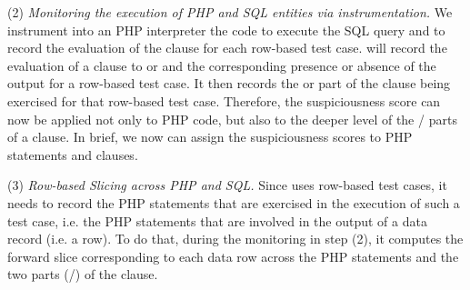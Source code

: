 
(2) {\em Monitoring the execution of PHP and SQL entities via
  instrumentation.} We instrument into an PHP interpreter the code to
execute the SQL query and to record the evaluation of the 
clause for each row-based test case. {\tool} will record the
evaluation of a  clause to  or  and
the corresponding presence or absence of the output for a row-based
test case. It then records the  or  part of the
 clause being exercised for that row-based test case.
Therefore, the suspiciousness score can now be applied not only to PHP
code, but also to the deeper level of the /
parts of a  clause. In brief, we now can assign the
suspiciousness scores to PHP statements and  clauses.



(3) {\em Row-based Slicing across PHP and SQL.} Since {\tool} uses
row-based test cases, it needs to record the PHP statements that are
exercised in the execution of such a test case, i.e. the PHP
statements that are involved in the output of a data record (i.e. a
row). To do that, during the monitoring in step (2), it computes the
forward slice corresponding to each data row across the PHP statements
and the two parts (/) of the 
clause.

